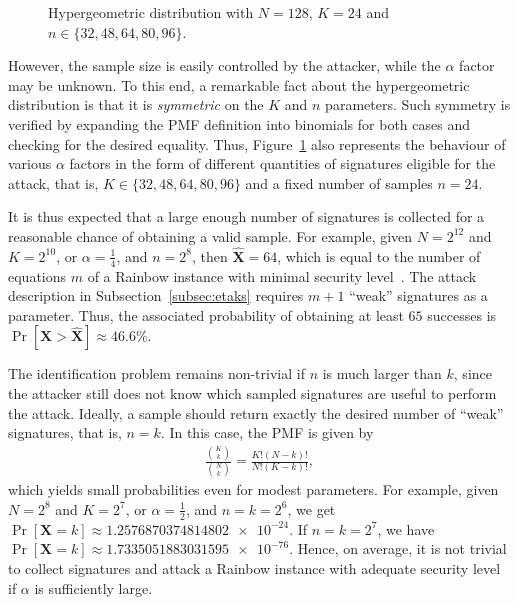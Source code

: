\documentclass[12pt, a4paper, oneside]{memoir}
\theoremstyle{definition}
\begin{document}
\begin{figure}[htbp]
  \caption{Hypergeometric distribution with
    $N = 128$, $K = 24$ and $n \in \{32, 48, 64, 80, 96\}$.}\label{fig:hyper}
\end{figure}

However, the sample size is easily controlled by the attacker, while the $\alpha$ factor may be unknown. To this end, a remarkable fact about the hypergeometric distribution is that it is \emph{symmetric} on the $K$ and $n$ parameters. Such symmetry is verified by expanding the PMF definition into binomials for both cases and checking for the desired equality. Thus, Figure~\ref{fig:hyper} also represents the behaviour of various $\alpha$ factors in the form of different quantities of signatures eligible for the attack, that is, $K \in \{32, 48, 64, 80, 96\}$ and a fixed number of samples $n = 24$.

It is thus expected that a large enough number of signatures is collected for a reasonable chance of obtaining a valid sample. For example, given $N = 2^{12}$ and $K = 2^{10}$, or $\alpha = \frac{1}{4}$, and $n = 2^{8}$, then $\widehat{\mathbf{X}} = 64$, which is equal to the number of equations $m$ of a Rainbow instance with minimal security level~\cite[Sec.~2.8]{Ding:201901}. The attack description in Subsection~\ref{subsec:etaks} requires $m + 1$ ``weak'' signatures as a parameter. Thus, the associated probability of obtaining at least $65$ successes is $\Pr[\mathbf{X} > \widehat{\mathbf{X}}] \approx 46.6\%$.

The identification problem remains non-trivial if $n$ is much larger than $k$, since the attacker still does not know which sampled signatures are useful to perform the attack. Ideally, a sample should return exactly the desired number of ``weak'' signatures, that is, $n = k$. In this case, the PMF is given by
\begin{align*}
  \frac{\binom{K}{k}}{\binom{N}{k}} = \frac{K! (N - k)!}{N! (K - k)!},
\end{align*}
which yields small probabilities even for modest parameters. For example, given $N = 2^{8}$ and $K = 2^{7}$, or $\alpha = \frac{1}{2}$, and $n = k = 2^{6}$, we get $\Pr[\mathbf{X} = k] \approx \num[round-mode=places,round-precision=4]{1.2576870374814802e-24}$. If $n = k = 2^{7}$, we have $\Pr[\mathbf{X} = k] \approx \num[round-mode=places,round-precision=4]{1.7335051883031595e-76}$. Hence, on average, it is not trivial to collect signatures and attack a Rainbow instance with adequate security level if $\alpha$ is sufficiently large.
\end{document}
